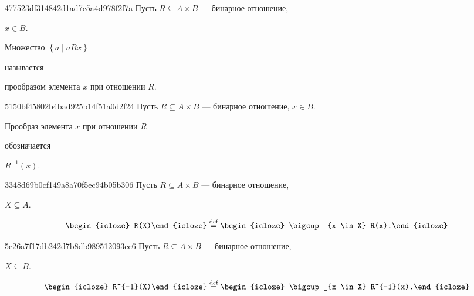 \begin{note}{477523df314842d1ad7c5a4d978f2f7a}
    Пусть \({ R \subseteq A \times B }\) --- бинарное отношение, \begin{icloze}{3}\({ x \in B }\).\end{icloze}
    \begin{icloze}{1}Множество \({ \left\{ a \mid aRx \right\} }\)\end{icloze} называется \begin{icloze}{2}прообразом элемента \({ x }\) при отношении \({ R }\).\end{icloze}
\end{note}

\begin{note}{5150bf45802b4bad925b14f51a0d2f24}
    Пусть \({ R \subseteq A \times B }\) --- бинарное отношение, \({ x \in B }\).
    \begin{icloze}{2}Прообраз элемента \({ x }\) при отношении \({ R }\)\end{icloze} обозначается \begin{icloze}{1}\({ R^{-1}(x) }\).\end{icloze}
\end{note}

\begin{note}{3348d69b0cf149a8a70f5ec94b05b306}
    Пусть \({ R \subseteq A \times B }\) --- бинарное отношение, \begin{icloze}{2}\({ X \subseteq A }\).\end{icloze}
    \[
        \begin{icloze}{3}R(X)\end{icloze} \overset{\text{def}}= \begin{icloze}{1}\bigcup_{x \in X} R(x).\end{icloze}
    \]
\end{note}

\begin{note}{5c26a7f17db242d7b8db989512093cc6}
    Пусть \({ R \subseteq A \times B }\) --- бинарное отношение, \begin{icloze}{2}\({ X \subseteq B }\).\end{icloze}
    \[
        \begin{icloze}{3}R^{-1}(X)\end{icloze} \overset{\text{def}}= \begin{icloze}{1}\bigcup_{x \in X} R^{-1}(x).\end{icloze}
    \]
\end{note}

